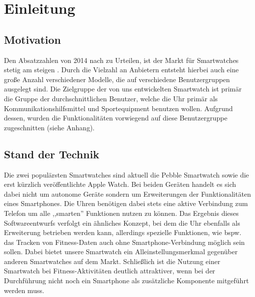 \chapter{Einleitung}

\section{Motivation}
Den Absatzzahlen von 2014 nach zu Urteilen, ist der Markt für Smartwatches stetig am steigen \cite{absatzzahlen}. Durch die Vielzahl an Anbietern entsteht hierbei auch eine große Anzahl verschiedener Modelle, die auf verschiedene Benutzergruppen ausgelegt sind. Die Zielgruppe der von uns entwickelten Smartwatch ist primär die Gruppe der durchschnittlichen Benutzer, welche die Uhr primär als Kommunikationshilfsmittel und Sportequipment benutzen wollen. Aufgrund dessen, wurden die Funktionalitäten vorwiegend auf diese Benutzergruppe zugeschnitten (siehe Anhang).

\section{Stand der Technik}
Die zwei populärsten Smartwatches sind aktuell die Pebble Smartwatch sowie die erst kürzlich veröffentlichte Apple Watch. Bei beiden Geräten handelt es sich dabei nicht um autonome Geräte sondern um Erweiterungen der Funktionalitäten eines Smartphones. Die Uhren benötigen dabei stets eine aktive Verbindung zum Telefon um alle ,,smarten'' Funktionen nutzen zu können. Das Ergebnis dieses Softwareentwurfs verfolgt ein ähnliches Konzept, bei dem die Uhr ebenfalls als Erweiterung betrieben werden kann, allerdings spezielle Funktionen, wie bspw. das Tracken von Fitness-Daten auch ohne Smartphone-Verbindung möglich sein sollen. Dabei bietet unsere Smartwatch ein Alleinstellungsmerkmal gegenüber anderen Smartwatches auf dem Markt. Schließlich ist die Nutzung einer Smartwatch bei Fitness-Aktivitäten deutlich attraktiver, wenn bei der Durchführung nicht noch ein Smartphone als zusätzliche Komponente mitgeführt werden muss.

